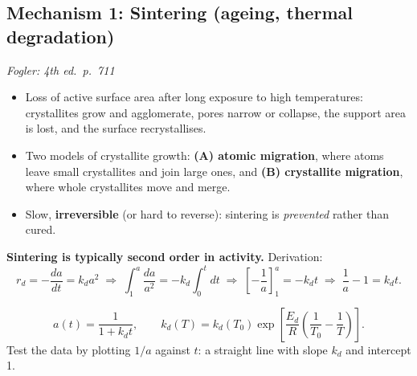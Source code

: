 \documentclass[11pt]{article}
\newcommand{\fogler}[1]{\hfill{\small\textit{\textcolor{keyblue}{Fogler: #1}}}}
\begin{document}
\subsection{Mechanism 1: Sintering (ageing, thermal degradation)}
\fogler{4th ed.\ p.~711}
\begin{itemize}
\item Loss of active surface area after long exposure to high temperatures: crystallites grow and agglomerate, pores
narrow or collapse, the support area is lost, and the surface recrystallises.
\item Two models of crystallite growth: \textbf{(A) atomic migration}, where atoms leave small crystallites and join large ones,
and \textbf{(B) crystallite migration}, where whole crystallites move and merge.
\item Slow, \textbf{irreversible} (or hard to reverse): sintering is \emph{prevented} rather than cured.
\end{itemize}
\begin{center}
\end{center}

\textbf{Sintering is typically second order in activity.} Derivation:
\[
r_d=-\frac{da}{dt}=k_da^2
\;\Rightarrow\;
\int_1^{a}\frac{da}{a^2}=-k_d\int_0^t dt
\;\Rightarrow\;
\left[-\frac{1}{a}\right]_1^{a}=-k_dt
\;\Rightarrow\;
\frac{1}{a}-1=k_dt .
\]
\begin{keyresult}
\[
a(t)=\frac{1}{1+k_dt},\qquad k_d(T)=k_d(T_0)\exp\!\left[\frac{E_d}{R}\left(\frac{1}{T_0}-\frac{1}{T}\right)\right].
\]
Test the data by plotting $1/a$ against $t$: a straight line with slope $k_d$ and intercept 1.
\end{keyresult}
\end{document}
